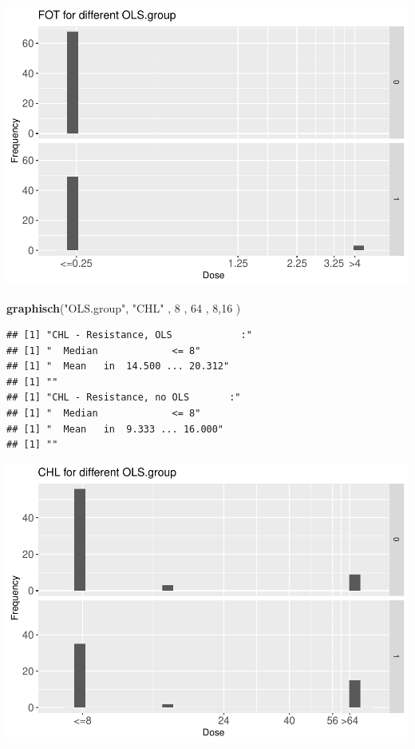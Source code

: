 \documentclass[
]{article}
\newenvironment{Shaded}{\begin{snugshade}}{\end{snugshade}}
\newcommand{\DecValTok}[1]{\textcolor[rgb]{0.00,0.00,0.81}{#1}}
\newcommand{\KeywordTok}[1]{\textcolor[rgb]{0.13,0.29,0.53}{\textbf{#1}}}
\newcommand{\NormalTok}[1]{#1}
\newcommand{\StringTok}[1]{\textcolor[rgb]{0.31,0.60,0.02}{#1}}
\begin{document}
\includegraphics{Verteilungen_files/figure-latex/unnamed-chunk-25-1.pdf}

\begin{Shaded}
\begin{Highlighting}[]
  \KeywordTok{graphisch}\NormalTok{(}\StringTok{"OLS.group"}\NormalTok{, }\StringTok{"CHL"}\NormalTok{ , }\DecValTok{8}\NormalTok{    ,  }\DecValTok{64}\NormalTok{   ,   }\DecValTok{8}\NormalTok{,}\DecValTok{16}\NormalTok{    ) }
\end{Highlighting}
\end{Shaded}

\begin{verbatim}
## [1] "CHL - Resistance, OLS            :"
## [1] "  Median             <= 8"
## [1] "  Mean   in  14.500 ... 20.312"
## [1] ""
## [1] "CHL - Resistance, no OLS       :"
## [1] "  Median             <= 8"
## [1] "  Mean   in  9.333 ... 16.000"
## [1] ""
\end{verbatim}

\includegraphics{Verteilungen_files/figure-latex/unnamed-chunk-26-1.pdf}
\end{document}
